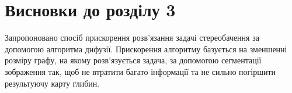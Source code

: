 \section*{Висновки до розділу 3}

Запропоновано спосіб прискорення розв'язання задачі стереобачення
за допомогою алгоритма дифузії.
Прискорення алгоритму базується на зменшенні розміру графу,
на якому розв'язується задача, за допомогою сегментації зображення так,
щоб не втратити багато інформації та
не сильно погіршити результуючу карту глибин.
